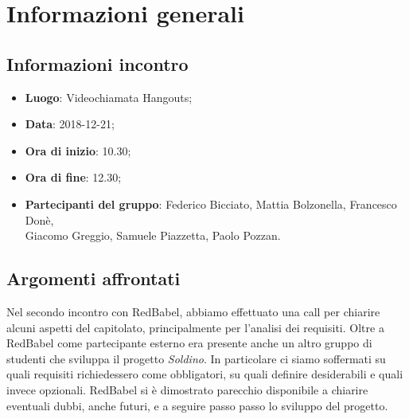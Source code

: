 \section{Informazioni generali}

\subsection{Informazioni incontro}
\begin{itemize}
\item \textbf{Luogo}: Videochiamata Hangouts;
\item \textbf{Data}: 2018-12-21;
\item \textbf{Ora di inizio}: 10.30;
\item \textbf{Ora di fine}: 12.30;
\item \textbf{Partecipanti del gruppo}: Federico Bicciato, Mattia Bolzonella, 
Francesco Donè,\\ Giacomo Greggio, Samuele Piazzetta, Paolo Pozzan.
\end{itemize}

\subsection{Argomenti affrontati}
Nel secondo incontro con RedBabel, abbiamo effettuato una call per chiarire alcuni aspetti del capitolato, principalmente per l'analisi dei requisiti.
Oltre a RedBabel come partecipante esterno era presente anche un altro gruppo di studenti che sviluppa il progetto \textit{Soldino}.
In particolare ci siamo soffermati su quali requisiti richiedessero come obbligatori, su quali definire desiderabili e quali invece opzionali.
RedBabel si è dimostrato parecchio disponibile a chiarire eventuali dubbi, anche futuri, e a seguire passo passo lo sviluppo del progetto.
